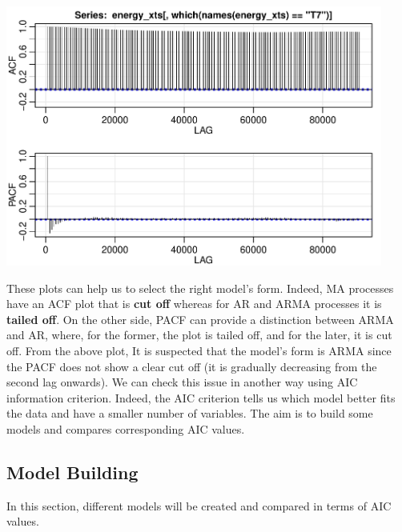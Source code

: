 \documentclass[]{article}
\begin{document}
\includegraphics[width=468]{README_figs/README-unnamed-chunk-15-1}

These plots can help us to select the right model's form. Indeed, MA
processes have an ACF plot that is \textbf{cut off} whereas for AR and
ARMA processes it is \textbf{tailed off}. On the other side, PACF can
provide a distinction between ARMA and AR, where, for the former, the
plot is tailed off, and for the later, it is cut off. From the above
plot, It is suspected that the model's form is ARMA since the PACF does
not show a clear cut off (it is gradually decreasing from the second lag
onwards). We can check this issue in another way using AIC information
criterion. Indeed, the AIC criterion tells us which model better fits
the data and have a smaller number of variables. The aim is to build
some models and compares corresponding AIC values.

\subsection{Model Building}\label{model-building}

In this section, different models will be created and compared in terms
of AIC values.
\end{document}
